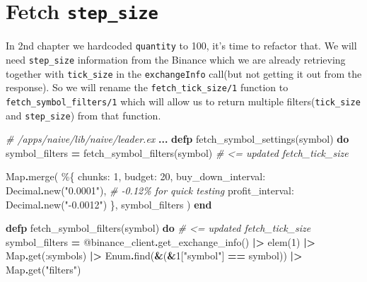 \documentclass[
]{book}
\newenvironment{Shaded}{\begin{snugshade}}{\end{snugshade}}
\newcommand{\CommentTok}[1]{\textcolor[rgb]{0.56,0.35,0.01}{\textit{#1}}}
\newcommand{\ConstantTok}[1]{\textcolor[rgb]{0.00,0.00,0.00}{#1}}
\newcommand{\DecValTok}[1]{\textcolor[rgb]{0.00,0.00,0.81}{#1}}
\newcommand{\KeywordTok}[1]{\textcolor[rgb]{0.13,0.29,0.53}{\textbf{#1}}}
\newcommand{\NormalTok}[1]{#1}
\newcommand{\OperatorTok}[1]{\textcolor[rgb]{0.81,0.36,0.00}{\textbf{#1}}}
\newcommand{\OtherTok}[1]{\textcolor[rgb]{0.56,0.35,0.01}{#1}}
\newcommand{\StringTok}[1]{\textcolor[rgb]{0.31,0.60,0.02}{#1}}
\newcommand{\VariableTok}[1]{\textcolor[rgb]{0.00,0.00,0.00}{#1}}
\begin{document}
\hypertarget{fetch-step_size}{%
\section{\texorpdfstring{Fetch \texttt{step\_size}}{Fetch step\_size}}\label{fetch-step_size}}

In 2nd chapter we hardcoded \texttt{quantity} to 100, it's time to refactor that. We will need \texttt{step\_size} information from the Binance which we are
already retrieving together with \texttt{tick\_size} in the \texttt{exchangeInfo} call(but not getting it out from the response). So we will rename the \texttt{fetch\_tick\_size/1} function to \texttt{fetch\_symbol\_filters/1} which will allow us to return multiple filters(\texttt{tick\_size} and \texttt{step\_size}) from that function.

\begin{Shaded}
\begin{Highlighting}[]
  \CommentTok{\# /apps/naive/lib/naive/leader.ex}
  \OperatorTok{...}
  \KeywordTok{defp}\NormalTok{ fetch\_symbol\_settings(symbol) }\KeywordTok{do}
\NormalTok{    symbol\_filters }\OperatorTok{=}\NormalTok{ fetch\_symbol\_filters(symbol) }\CommentTok{\# \textless{}= updated fetch\_tick\_size}
    
    \ConstantTok{Map}\OperatorTok{.}\NormalTok{merge(}
\NormalTok{      \%\{}
        \VariableTok{chunks:} \DecValTok{1}\NormalTok{,}
        \VariableTok{budget:} \DecValTok{20}\NormalTok{,}
        \VariableTok{buy\_down\_interval:} \ConstantTok{Decimal}\OperatorTok{.}\NormalTok{new(}\StringTok{"0.0001"}\NormalTok{),}
        \CommentTok{\# {-}0.12\% for quick testing}
        \VariableTok{profit\_interval:} \ConstantTok{Decimal}\OperatorTok{.}\NormalTok{new(}\StringTok{"{-}0.0012"}\NormalTok{)}
\NormalTok{      \},}
\NormalTok{      symbol\_filters}
\NormalTok{    )}
  \KeywordTok{end}

  \KeywordTok{defp}\NormalTok{ fetch\_symbol\_filters(symbol) }\KeywordTok{do}  \CommentTok{\# \textless{}= updated fetch\_tick\_size}
\NormalTok{    symbol\_filters }\OperatorTok{=}
      \OtherTok{@binance\_client}\OperatorTok{.}\NormalTok{get\_exchange\_info()}
      \OperatorTok{|\textgreater{}}\NormalTok{ elem(}\DecValTok{1}\NormalTok{)}
      \OperatorTok{|\textgreater{}} \ConstantTok{Map}\OperatorTok{.}\NormalTok{get(}\VariableTok{:symbols}\NormalTok{)}
      \OperatorTok{|\textgreater{}} \ConstantTok{Enum}\OperatorTok{.}\NormalTok{find(}\OperatorTok{\&}\NormalTok{(}\OperatorTok{\&}\DecValTok{1}\NormalTok{[}\StringTok{"symbol"}\NormalTok{] }\OperatorTok{==}\NormalTok{ symbol))}
      \OperatorTok{|\textgreater{}} \ConstantTok{Map}\OperatorTok{.}\NormalTok{get(}\StringTok{"filters"}\NormalTok{)}


\end{Highlighting}
\end{Shaded}
\end{document}
